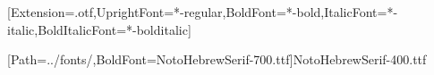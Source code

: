 \usepackage{fontspec}
\setmainfont{texgyrepagella}[Extension=.otf,UprightFont=*-regular,BoldFont=*-bold,ItalicFont=*-italic,BoldItalicFont=*-bolditalic]
\usepackage[bidi=default]{babel}
[Path=../fonts/,BoldFont=NotoHebrewSerif-700.ttf]{NotoHebrewSerif-400.ttf}
\newcommand{\heb}[1]{\mbox{\foreignlanguage{hebrew}{#1}}}
\usepackage{xcolor,tikz}
\usetikzlibrary{arrows.meta,positioning,calc,backgrounds}
